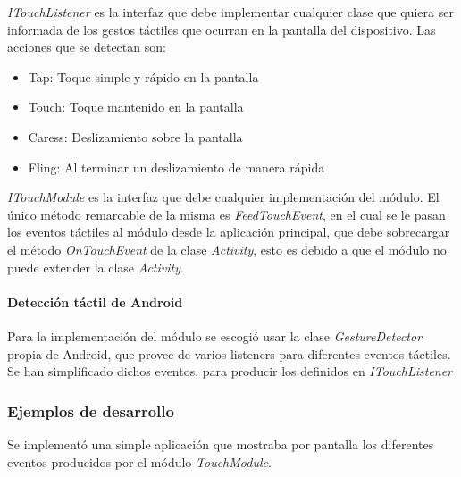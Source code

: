 \textit{ITouchListener} es la interfaz que debe implementar cualquier clase que quiera ser informada de los gestos táctiles que ocurran en la pantalla del dispositivo. Las acciones que se detectan son:

\begin{itemize}
	\item  Tap: Toque simple y rápido en la pantalla
	\item  Touch: Toque mantenido en la pantalla
	\item  Caress: Deslizamiento sobre la pantalla
	\item  Fling: Al terminar un deslizamiento de manera rápida
\end{itemize}


\textit{ITouchModule} es la interfaz que debe cualquier implementación del módulo. El único método remarcable de la misma es \textit{FeedTouchEvent}, en el cual se le pasan los eventos táctiles al módulo desde la aplicación principal, que debe sobrecargar el método \textit{OnTouchEvent} de la clase \textit{Activity}, esto es debido a que el módulo no puede extender la clase \textit{Activity}.

\paragraph*{Detección táctil de Android\\}


Para la implementación del módulo se escogió usar la clase \textit{GestureDetector} propia de Android, que provee de varios listeners para diferentes eventos táctiles.
Se han simplificado dichos eventos, para producir los definidos en \textit{ITouchListener}

\subsubsection*{Ejemplos de desarrollo}

Se implementó una simple aplicación que mostraba por pantalla los diferentes eventos producidos por el módulo \textit{TouchModule}.


\newpage

